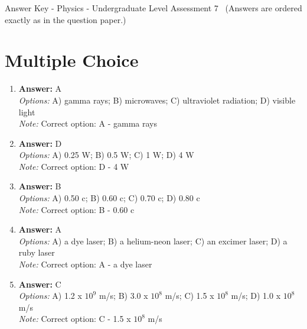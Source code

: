 \documentclass[12pt]{article}
\begin{document}
\begin{center}
Answer Key - Physics - Undergraduate Level Assessment 7 \
\small (Answers are ordered exactly as in the question paper.)
\end{center}

\section*{Multiple Choice}
\begin{enumerate}[label=\arabic*.]
\item \textbf{Answer:} A
\\ \textit{Options:} A) gamma rays; B) microwaves; C) ultraviolet radiation; D) visible light
\\ \textit{Note:} Correct option: A - gamma rays
\item \textbf{Answer:} D
\\ \textit{Options:} A) 0.25 W; B) 0.5 W; C) 1 W; D) 4 W
\\ \textit{Note:} Correct option: D - 4 W
\item \textbf{Answer:} B
\\ \textit{Options:} A) 0.50 c; B) 0.60 c; C) 0.70 c; D) 0.80 c
\\ \textit{Note:} Correct option: B - 0.60 c
\item \textbf{Answer:} A
\\ \textit{Options:} A) a dye laser; B) a helium-neon laser; C) an excimer laser; D) a ruby laser
\\ \textit{Note:} Correct option: A - a dye laser
\item \textbf{Answer:} C
\\ \textit{Options:} A) 1.2 x $10^9$ m/s; B) 3.0 x $10^8$ m/s; C) 1.5 x $10^8$ m/s; D) 1.0 x $10^8$ m/s
\\ \textit{Note:} Correct option: C - 1.5 x $10^8$ m/s
\end{enumerate}
\end{document}
